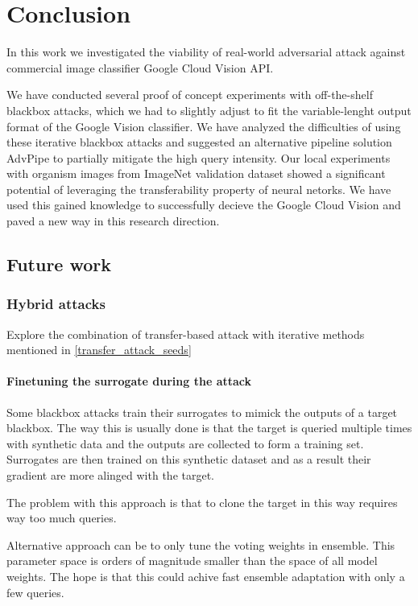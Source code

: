 \chapter{Conclusion}
\label{conclusion}
In this work we investigated the viability of real-world adversarial attack against commercial image classifier Google Cloud Vision API. 

We have conducted several proof of concept experiments with off-the-shelf blackbox attacks, which we had to slightly adjust to fit the variable-lenght output format of the Google Vision classifier. We have analyzed the difficulties of using these iterative blackbox attacks and suggested an alternative pipeline solution AdvPipe to partially mitigate the high query intensity. Our local experiments with organism images from ImageNet validation dataset showed a significant potential of leveraging the transferability property of neural netorks. We have used this gained knowledge to successfully decieve the Google Cloud Vision and paved a new way in this research direction.


\section{Future work}
\label{future_work}

\subsection{Hybrid attacks}
Explore the combination of transfer-based attack with iterative methods mentioned in \ref{transfer_attack_seeds}

\subsubsection{Finetuning the surrogate during the attack}
Some blackbox attacks train their surrogates to mimick the outputs of a target blackbox. The way this is usually done is that the target is queried multiple times with synthetic data and the outputs are collected to form a training set. Surrogates are then trained on this synthetic dataset and as a result their gradient are more alinged with the target. \cite{papernot2017practical}

The problem with this approach is that to clone the target in this way requires way too much queries.

Alternative approach can be to only tune the voting weights in ensemble. This parameter space is orders of magnitude smaller than the space of all model weights. The hope is that this could achive fast ensemble adaptation with only a few queries.


